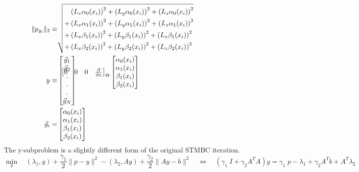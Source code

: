 \documentclass[10pt]{amsart}
\begin{document}
\[{\begin{bmatrix}
 0 & 0 & 0 & \frac{\partial }{\partial z} \\
\end{bmatrix} 
}_{\Theta }
\begin{bmatrix} 
 \alpha_0(x_i) \\
 \alpha_1(x_i) \\
  \beta_1(x_i) \\
  \beta_2(x_i) \\
\end{bmatrix} 
\qquad
\hspace{-2.5in}
\begin{split}
\|p_{g_i}\|_2 \equiv &
 \sqrt{
   \begin{split}
    &\left(L_x \alpha_0 (x_i) \right)^2 + \left(L_y \alpha_0 (x_i) \right)^2 + \left(L_z \alpha_0 (x_i) \right)^2 \\ 
   +&\left(L_x \alpha_1 (x_i) \right)^2 + \left(L_y \alpha_1 (x_i) \right)^2 + \left(L_z \alpha_1 (x_i) \right)^2 \\ 
   +&\left(L_x  \beta_1 (x_i) \right)^2 + \left(L_y  \beta_1 (x_i) \right)^2 + \left(L_z  \beta_1 (x_i) \right)^2 \\ 
   +&\left(L_x  \beta_2 (x_i) \right)^2 + \left(L_y  \beta_2 (x_i) \right)^2 + \left(L_z  \beta_2 (x_i) \right)^2 \\ 
   \end{split}
  }
\\
y
\equiv &
\begin{bmatrix} 
\vec{g}_1\\
\vec{g}_2\\
     .   \\
     .   \\
     .   \\
\vec{g}_N\\
\end{bmatrix} 
\\
\vec{g}_i
= &
\begin{bmatrix} 
 \alpha_0(x_i) \\
 \alpha_1(x_i) \\
  \beta_1(x_i) \\
  \beta_2(x_i) \\
\end{bmatrix} 
\end{split}
\]
The y-subproblem is a slightly different form of the original STMBC iteration.
\[
   \min_{y} \quad
          \left(\lambda_1, y\right) + \frac{\gamma_1}{2} \|p - y\|^2
        - \left(\lambda_2,Ay \right) + \frac{\gamma_2}{2} \|A y - b\|^2
\quad \Leftrightarrow \quad
   \left(\gamma_1 \; I  + \gamma_2 A^T A  \right) y
    = 
    \gamma_1 \;  p  -\lambda_1 + \gamma_2 A^T b + A^T  \lambda_2
\]
\end{document}
